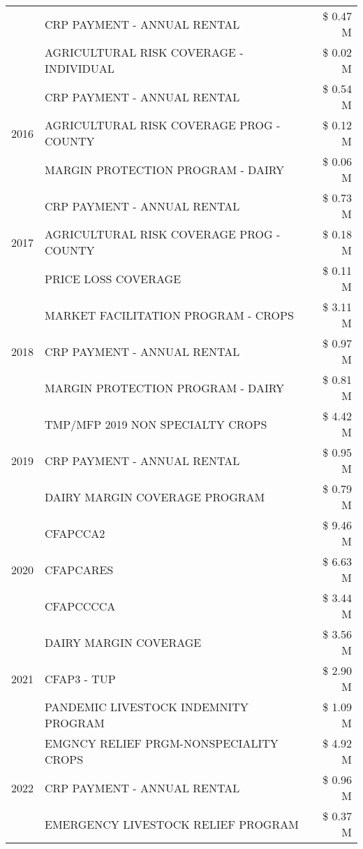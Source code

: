 \begin{tabular}{llr}
 & CRP PAYMENT - ANNUAL RENTAL & \$ 0.47 M \\
 & AGRICULTURAL RISK COVERAGE - INDIVIDUAL & \$ 0.02 M \\
\cline{1-3}
\multirow[t]{3}{*}{2016} & CRP PAYMENT - ANNUAL RENTAL & \$ 0.54 M \\
 & AGRICULTURAL RISK COVERAGE PROG - COUNTY & \$ 0.12 M \\
 & MARGIN PROTECTION PROGRAM - DAIRY & \$ 0.06 M \\
\cline{1-3}
\multirow[t]{3}{*}{2017} & CRP PAYMENT - ANNUAL RENTAL & \$ 0.73 M \\
 & AGRICULTURAL RISK COVERAGE PROG - COUNTY & \$ 0.18 M \\
 & PRICE LOSS COVERAGE & \$ 0.11 M \\
\cline{1-3}
\multirow[t]{3}{*}{2018} & MARKET FACILITATION PROGRAM - CROPS & \$ 3.11 M \\
 & CRP PAYMENT - ANNUAL RENTAL & \$ 0.97 M \\
 & MARGIN PROTECTION PROGRAM - DAIRY & \$ 0.81 M \\
\cline{1-3}
\multirow[t]{3}{*}{2019} & TMP/MFP 2019 NON SPECIALTY CROPS & \$ 4.42 M \\
 & CRP PAYMENT - ANNUAL RENTAL & \$ 0.95 M \\
 & DAIRY MARGIN COVERAGE PROGRAM & \$ 0.79 M \\
\cline{1-3}
\multirow[t]{3}{*}{2020} & CFAPCCA2 & \$ 9.46 M \\
 & CFAPCARES & \$ 6.63 M \\
 & CFAPCCCCA & \$ 3.44 M \\
\cline{1-3}
\multirow[t]{3}{*}{2021} & DAIRY MARGIN COVERAGE & \$ 3.56 M \\
 & CFAP3 - TUP & \$ 2.90 M \\
 & PANDEMIC LIVESTOCK INDEMNITY PROGRAM & \$ 1.09 M \\
\cline{1-3}
\multirow[t]{3}{*}{2022} & EMGNCY RELIEF PRGM-NONSPECIALITY CROPS & \$ 4.92 M \\
 & CRP PAYMENT - ANNUAL RENTAL & \$ 0.96 M \\
 & EMERGENCY LIVESTOCK RELIEF PROGRAM & \$ 0.37 M \\
\cline{1-3}
\bottomrule
\end{tabular}
